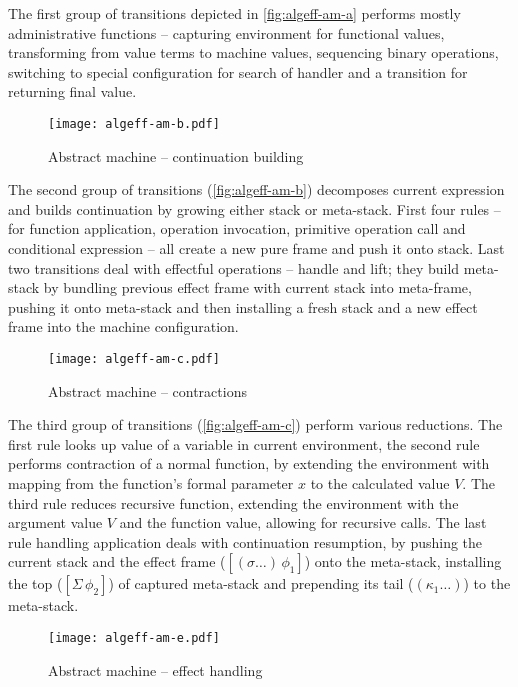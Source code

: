 \documentclass[inz, english, shortabstract]{iithesis}
\begin{document}
The first group of transitions depicted in \autoref{fig:algeff-am-a} performs mostly administrative functions -- capturing environment for functional values, transforming from value terms to machine values, sequencing binary operations, switching to special configuration for search of handler and a transition for returning final value.

\begin{figure}[h]
  \centering
  \texttt{[image: algeff-am-b.pdf]} 
  \caption{Abstract machine -- continuation building}
  \label{fig:algeff-am-b}
\end{figure}

The second group of transitions (\autoref{fig:algeff-am-b}) decomposes current expression and builds continuation by growing either stack or meta-stack.
First four rules -- for function application, operation invocation, primitive operation call and conditional expression -- all create a new pure frame and push it onto stack.
Last two transitions deal with effectful operations -- handle and lift; they build meta-stack by bundling previous effect frame with current stack into meta-frame, pushing it onto meta-stack and then installing a fresh stack and a new effect frame into the machine configuration.

\begin{figure}[h]
  \centering 
  \texttt{[image: algeff-am-c.pdf]}
  \caption{Abstract machine -- contractions}
  \label{fig:algeff-am-c}
\end{figure}

The third group of transitions (\autoref{fig:algeff-am-c}) perform various reductions.
The first rule looks up value of a variable in current environment, the second rule performs contraction of a normal function, by extending the environment with mapping from the function's formal parameter $ x $ to the calculated value $ V $.
The third rule reduces recursive function, extending the environment with the argument value $ V $ and the function value, allowing for recursive calls.
The last rule handling application deals with continuation resumption, by pushing the current stack and the effect frame ($ [(\sigma \ldots) \, \phi_1] $) onto the meta-stack, installing the top ($ [\Sigma \, \phi_2] $) of captured meta-stack and prepending its tail ($ (\kappa_1 \ldots) $) to the meta-stack.

\begin{figure}[h]
  \centering
  \texttt{[image: algeff-am-e.pdf]}
  \caption{Abstract machine -- effect handling}
  \label{fig:algeff-am-e}
\end{figure}
\end{document}
